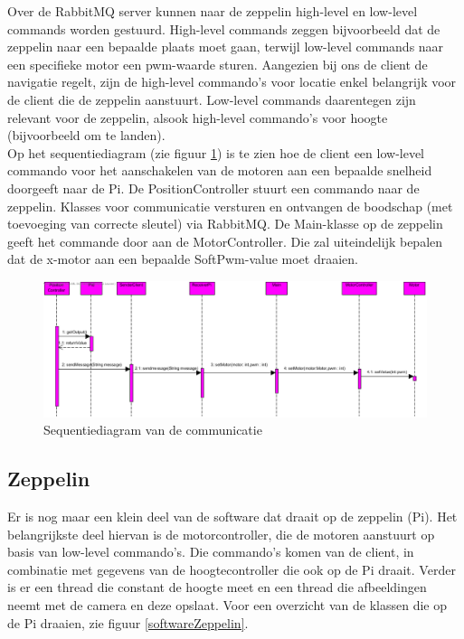 \documentclass[eind]{penoverslag}
\begin{document}
Over de RabbitMQ server kunnen naar de zeppelin high-level en low-level commands worden gestuurd. High-level commands zeggen bijvoorbeeld dat de zeppelin naar een bepaalde plaats moet gaan, terwijl low-level commands naar een specifieke motor een pwm-waarde sturen. Aangezien bij ons de client de navigatie regelt, zijn de high-level commando's voor locatie enkel belangrijk voor de client die de zeppelin aanstuurt. Low-level commands daarentegen zijn relevant voor de zeppelin, alsook high-level commando's voor hoogte (bijvoorbeeld om te landen). \\


Op het sequentiediagram (zie figuur \ref{Sequence}) is te zien hoe de client een low-level commando voor het aanschakelen van de motoren aan een bepaalde snelheid doorgeeft naar de Pi. De PositionController stuurt een commando naar de zeppelin. Klasses voor communicatie versturen en ontvangen de boodschap (met toevoeging van correcte sleutel) via RabbitMQ. De Main-klasse op de zeppelin geeft het commande door aan de MotorController. Die zal uiteindelijk bepalen dat de x-motor aan een bepaalde SoftPwm-value moet draaien.
\\

\begin{figure}[H]
\begin{center}
\includegraphics[width=1\textwidth]{SequenceDiagram1.png}
\end{center}
\caption{Sequentiediagram van de communicatie}
\label{Sequence}
\end{figure} 

\subsection{Zeppelin}
Er is nog maar een klein deel van de software dat draait op de zeppelin (Pi). Het belangrijkste deel hiervan is de motorcontroller, die de motoren aanstuurt op basis van low-level commando's. Die commando's komen van de client, in combinatie met gegevens van de hoogtecontroller die ook op de Pi draait. Verder is er een thread die constant de hoogte meet en een thread die afbeeldingen neemt met de camera en deze opslaat. Voor een overzicht van de klassen die op de Pi draaien, zie figuur \ref{softwareZeppelin}.\\
\end{document}
